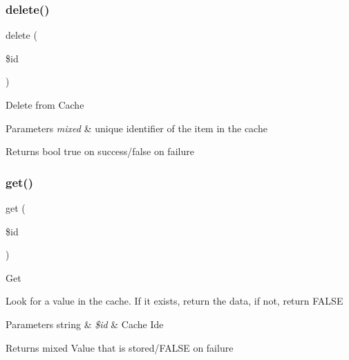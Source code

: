 \subsubsection{\texorpdfstring{delete()}{delete()}}
{\footnotesize\ttfamily delete (\begin{DoxyParamCaption}\item[{}]{\$id }\end{DoxyParamCaption})}

Delete from Cache


\begin{DoxyParams}{Parameters}
{\em mixed} & unique identifier of the item in the cache \\
\hline
\end{DoxyParams}
\begin{DoxyReturn}{Returns}
bool true on success/false on failure 
\end{DoxyReturn}
\mbox{\label{class_c_i___cache__wincache_a50e3bfb586b2f42932a6a93f3fbb0828}} 
\subsubsection{\texorpdfstring{get()}{get()}}
{\footnotesize\ttfamily get (\begin{DoxyParamCaption}\item[{}]{\$id }\end{DoxyParamCaption})}

Get

Look for a value in the cache. If it exists, return the data, if not, return F\+A\+L\+SE


\begin{DoxyParams}[1]{Parameters}
string & {\em \$id} & Cache Ide \\
\hline
\end{DoxyParams}
\begin{DoxyReturn}{Returns}
mixed Value that is stored/\+F\+A\+L\+SE on failure 
\end{DoxyReturn}
\mbox{\label{class_c_i___cache__wincache_a59635cf18e997c5141bffa05ff7622e0}} 
